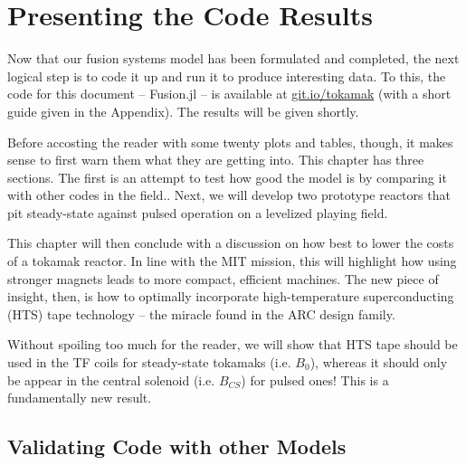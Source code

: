 %
%
%
%
%
%
%
%

\chapter{Presenting the Code Results}

Now that our fusion systems model has been formulated and completed, the next logical step is to code it up and run it to produce interesting data. To this, the code for this document -- Fusion.jl -- is available at \href{http://git.io/tokamak}{git.io/tokamak} (with a short guide given in the Appendix). The results will be given shortly.

Before accosting the reader with some twenty plots and tables, though, it makes sense to first warn them what they are getting into. This chapter has three sections. The first is an attempt to test how good the model is by comparing it with other codes in the field.\cite{arc,eupulsed,process}. Next, we will develop two prototype reactors that pit steady-state against pulsed operation on a levelized playing field.

This chapter will then conclude with a discussion on how best to lower the costs of a tokamak reactor. In line with the MIT mission, this will highlight how using stronger magnets leads to more compact, efficient machines. The new piece of insight, then, is how to optimally incorporate high-temperature superconducting (HTS) tape technology -- the miracle found in the ARC design family. 

Without spoiling too much for the reader, we will show that HTS tape should be used in the TF coils for steady-state tokamaks (i.e. $B_0$), whereas it should only be appear in the central solenoid (i.e. $B_{CS}$) for pulsed ones! This is a fundamentally new result.

\section{Validating Code with other Models}

